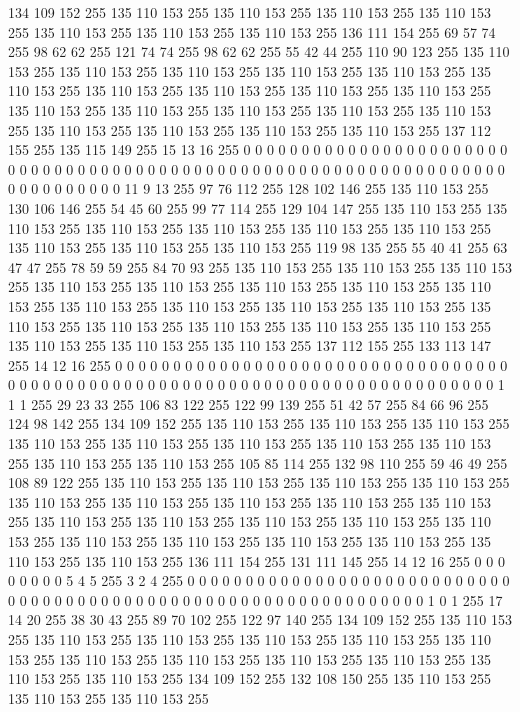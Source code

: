 134 109 152 255 135 110 153 255 135 110 153 255 135 110 153 255 135 110 153 255 135 110 153 255 135 110 153 255 135 110 153 255 136 111 154 255 69 57 74 255 98 62 62 255 121 74 74 255 98 62 62 255 55 42 44 255 110 90 123 255 135 110 153 255
135 110 153 255 135 110 153 255 135 110 153 255 135 110 153 255 135 110 153 255 135 110 153 255 135 110 153 255 135 110 153 255 135 110 153 255 135 110 153 255 135 110 153 255 135 110 153 255 135 110 153 255 135 110 153 255 135 110 153 255 135 110 153 255
135 110 153 255 135 110 153 255 137 112 155 255 135 115 149 255 15 13 16 255 0 0 0 0 0 0 0 0 0 0 0 0 0 0 0 0 0 0 0 0 0 0 0 0 0 0 0 0 0 0 0 0 0 0 0 0 0 0 0 0 0 0 0 0
0 0 0 0 0 0 0 0 0 0 0 0 0 0 0 0 0 0 0 0 0 0 0 0 0 0 0 0 0 0 0 0 11 9 13 255 97 76 112 255 128 102 146 255 135 110 153 255 130 106 146 255 54 45 60 255 99 77 114 255 129 104 147 255
135 110 153 255 135 110 153 255 135 110 153 255 135 110 153 255 135 110 153 255 135 110 153 255 135 110 153 255 135 110 153 255 135 110 153 255 119 98 135 255 55 40 41 255 63 47 47 255 78 59 59 255 84 70 93 255 135 110 153 255 135 110 153 255
135 110 153 255 135 110 153 255 135 110 153 255 135 110 153 255 135 110 153 255 135 110 153 255 135 110 153 255 135 110 153 255 135 110 153 255 135 110 153 255 135 110 153 255 135 110 153 255 135 110 153 255 135 110 153 255 135 110 153 255 135 110 153 255
135 110 153 255 135 110 153 255 137 112 155 255 133 113 147 255 14 12 16 255 0 0 0 0 0 0 0 0 0 0 0 0 0 0 0 0 0 0 0 0 0 0 0 0 0 0 0 0 0 0 0 0 0 0 0 0 0 0 0 0 0 0 0 0
0 0 0 0 0 0 0 0 0 0 0 0 0 0 0 0 0 0 0 0 0 0 0 0 0 0 0 0 0 0 0 0 1 1 1 255 29 23 33 255 106 83 122 255 122 99 139 255 51 42 57 255 84 66 96 255 124 98 142 255 134 109 152 255
135 110 153 255 135 110 153 255 135 110 153 255 135 110 153 255 135 110 153 255 135 110 153 255 135 110 153 255 135 110 153 255 135 110 153 255 135 110 153 255 105 85 114 255 132 98 110 255 59 46 49 255 108 89 122 255 135 110 153 255 135 110 153 255
135 110 153 255 135 110 153 255 135 110 153 255 135 110 153 255 135 110 153 255 135 110 153 255 135 110 153 255 135 110 153 255 135 110 153 255 135 110 153 255 135 110 153 255 135 110 153 255 135 110 153 255 135 110 153 255 135 110 153 255 135 110 153 255
135 110 153 255 135 110 153 255 136 111 154 255 131 111 145 255 14 12 16 255 0 0 0 0 0 0 0 0 5 4 5 255 3 2 4 255 0 0 0 0 0 0 0 0 0 0 0 0 0 0 0 0 0 0 0 0 0 0 0 0 0 0 0 0
0 0 0 0 0 0 0 0 0 0 0 0 0 0 0 0 0 0 0 0 0 0 0 0 0 0 0 0 0 0 0 0 0 0 0 0 1 0 1 255 17 14 20 255 38 30 43 255 89 70 102 255 122 97 140 255 134 109 152 255 135 110 153 255
135 110 153 255 135 110 153 255 135 110 153 255 135 110 153 255 135 110 153 255 135 110 153 255 135 110 153 255 135 110 153 255 135 110 153 255 135 110 153 255 135 110 153 255 134 109 152 255 132 108 150 255 135 110 153 255 135 110 153 255 135 110 153 255
